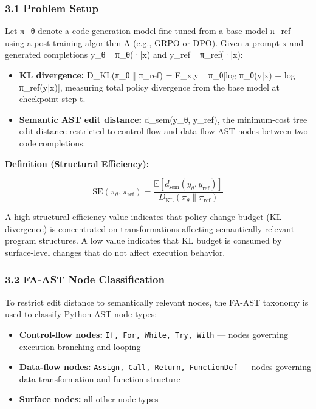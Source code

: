 
\subsubsection{3.1 Problem Setup}

Let π_θ denote a code generation model fine-tuned from a base model π_ref using a post-training algorithm A (e.g., GRPO or DPO). Given a prompt x and generated completions y_θ ~ π_θ(·|x) and y_ref ~ π_ref(·|x):

\begin{itemize}
\item \textbf{KL divergence:} D_KL(π_θ ‖ π_ref) = E_{x,y ~ π_θ}[log π_θ(y|x) − log π_ref(y|x)], measuring total policy divergence from the base model at checkpoint step t.
\item \textbf{Semantic AST edit distance:} d_sem(y_θ, y_ref), the minimum-cost tree edit distance restricted to control-flow and data-flow AST nodes between two code completions.
\end{itemize}

\textbf{Definition (Structural Efficiency):}

$$\text{SE}(\pi_\theta, \pi_\text{ref}) = \frac{\mathbb{E}[d_\text{sem}(y_\theta, y_\text{ref})]}{D_\text{KL}(\pi_\theta \| \pi_\text{ref})}$$

A high structural efficiency value indicates that policy change budget (KL divergence) is concentrated on transformations affecting semantically relevant program structures. A low value indicates that KL budget is consumed by surface-level changes that do not affect execution behavior.

\subsubsection{3.2 FA-AST Node Classification}

To restrict edit distance to semantically relevant nodes, the FA-AST taxonomy \citep{Wangetal2020} is used to classify Python AST node types:

\begin{itemize}
\item \textbf{Control-flow nodes:} \texttt{{If, For, While, Try, With}} — nodes governing execution branching and looping
\item \textbf{Data-flow nodes:} \texttt{{Assign, Call, Return, FunctionDef}} — nodes governing data transformation and function structure
\item \textbf{Surface nodes:} all other node types
\end{itemize}

